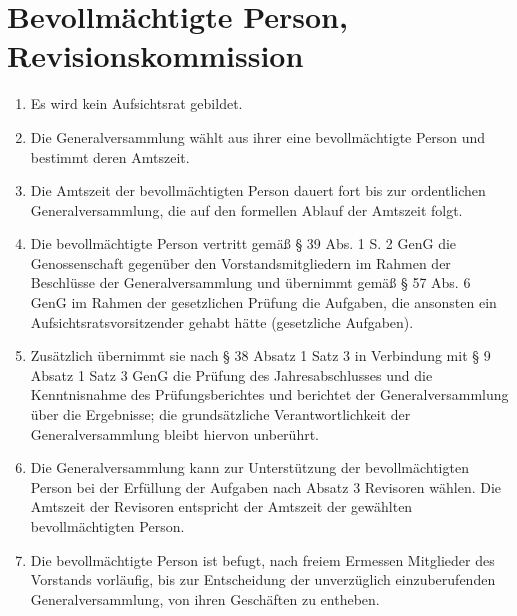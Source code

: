 \documentclass[a4paper, 12pt]{scrartcl}
\begin{document}
\section{Bevollmächtigte Person, Revisionskommission}
\begin{enumerate}
  \item Es wird kein Aufsichtsrat gebildet.
  \item Die Generalversammlung wählt aus ihrer eine bevollmächtigte Person und bestimmt deren Amtszeit.
  \item Die Amtszeit der bevollmächtigten Person dauert fort bis zur ordentlichen Generalversammlung, die auf den formellen Ablauf der Amtszeit folgt.
  \item Die bevollmächtigte Person vertritt gemäß § 39 Abs. 1 S. 2 GenG die Genossenschaft gegenüber den Vorstandsmitgliedern im Rahmen der Beschlüsse der Generalversammlung und übernimmt gemäß § 57 Abs. 6 GenG im Rahmen der gesetzlichen Prüfung die Aufgaben, die ansonsten ein Aufsichtsratsvorsitzender gehabt hätte (gesetzliche Aufgaben).
  \item Zusätzlich übernimmt sie nach § 38 Absatz 1 Satz 3 in Verbindung mit § 9 Absatz 1 Satz 3 GenG die Prüfung des Jahresabschlusses und die Kenntnisnahme des Prüfungsberichtes und berichtet der Generalversammlung über die Ergebnisse; die grundsätzliche Verantwortlichkeit der Generalversammlung bleibt hiervon unberührt.
  \item Die Generalversammlung kann zur Unterstützung der bevollmächtigten Person bei der Erfüllung der Aufgaben nach Absatz 3 Revisoren wählen. Die Amtszeit der Revisoren entspricht der Amtszeit der gewählten bevollmächtigten Person.
  \item Die bevollmächtigte Person ist befugt, nach freiem Ermessen Mitglieder des Vorstands vorläufig, bis zur Entscheidung der unverzüglich einzuberufenden Generalversammlung, von ihren Geschäften zu entheben.
\end{enumerate}
\end{document}
